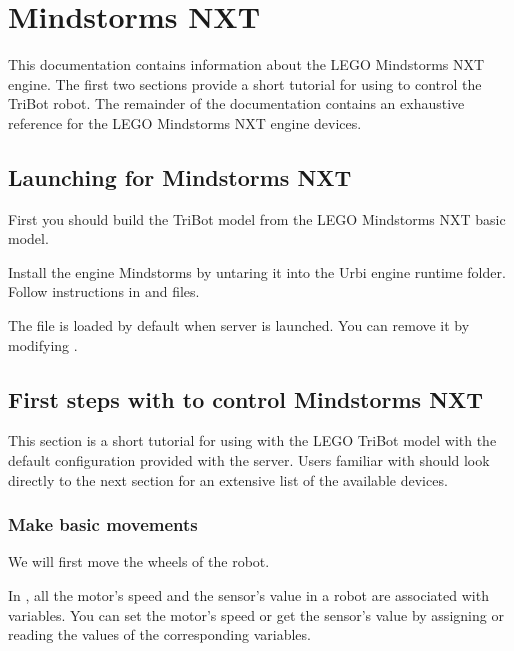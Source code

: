 
\chapter{Mindstorms NXT}
\label{sec:nxt}

This documentation contains information about the LEGO Mindstorms NXT \urbi
engine.  The first two sections provide a short tutorial for using \urbi to
control the TriBot robot.  The remainder of the documentation contains an
exhaustive reference for the LEGO Mindstorms NXT \urbi engine devices.

\section{Launching \urbi for Mindstorms NXT}

First you should build the TriBot model from the LEGO Mindstorms NXT basic
model.

Install the engine Mindstorms by untaring it into the Urbi engine runtime
folder. Follow instructions in  and  files.

The file  is loaded by default when server is launched. You
can remove it by modifying .

\section{First steps with \urbi to control Mindstorms NXT}

This section is a short tutorial for using \urbi with the LEGO TriBot model
with the default configuration provided with the \urbi server. Users
familiar with \urbi should look directly to the next section for an
extensive list of the available devices.

\subsection{Make basic movements}

We will first move the wheels of the robot.

In \urbi, all the motor's speed and the sensor's value in a robot are associated
with variables. You can set the motor's speed or get the sensor's value by
assigning or reading the values of the corresponding variables.

